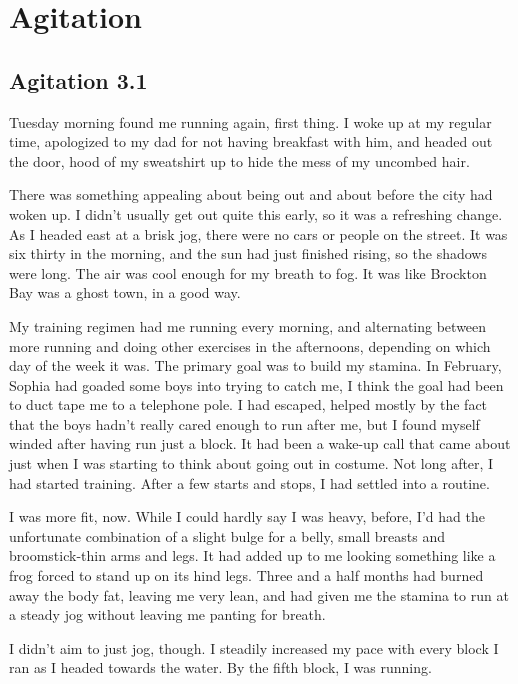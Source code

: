 \part[p1]{Agitation}

\chapter[c3.1]{Agitation 3.1}

Tuesday morning found me running again, first thing. I woke up at my regular time, apologized to my dad for not having breakfast with him, and headed out the door, hood of my sweatshirt up to hide the mess of my uncombed hair.

There was something appealing about being out and about before the city had woken up. I didn't usually get out quite this early, so it was a refreshing change. As I headed east at a brisk jog, there were no cars or people on the street. It was six thirty in the morning, and the sun had just finished rising, so the shadows were long. The air was cool enough for my breath to fog. It was like Brockton Bay was a ghost town, in a good way.

My training regimen had me running every morning, and alternating between more running and doing other exercises in the afternoons, depending on which day of the week it was. The primary goal was to build my stamina. In February, Sophia had goaded some boys into trying to catch me, I think the goal had been to duct tape me to a telephone pole. I had escaped, helped mostly by the fact that the boys hadn't really cared enough to run after me, but I found myself winded after having run just a block. It had been a wake-up call that came about just when I was starting to think about going out in costume. Not long after, I had started training. After a few starts and stops, I had settled into a routine.

I was more fit, now. While I could hardly say I was heavy, before, I'd had the unfortunate combination of a slight bulge for a belly, small breasts and broomstick-thin arms and legs. It had added up to me looking something like a frog forced to stand up on its hind legs. Three and a half months had burned away the body fat, leaving me very lean, and had given me the stamina to run at a steady jog without leaving me panting for breath.

I didn't aim to just jog, though. I steadily increased my pace with every block I ran as I headed towards the water. By the fifth block, I was running.

